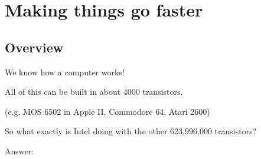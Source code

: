 \documentclass[english,compress]{beamer}
\begin{document}
\section[Faster]{Making things go faster}
\subsection{Overview}
\begin{frame}{We know how a computer works!}

  All of this can be built in about 4000 transistors.

  (e.g. MOS 6502 in Apple II, Commodore 64, Atari 2600)
  \medskip

  So what exactly is Intel doing with the other 623,996,000 transistors?
  \medskip

  Answer: 
  \medskip

\end{frame}
\end{document}
